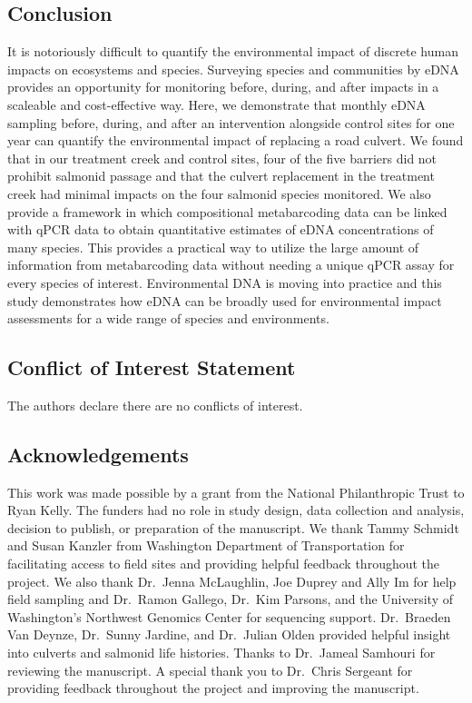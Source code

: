 \documentclass[
]{article}
\begin{document}
\hypertarget{conclusion}{%
\subsection{Conclusion}\label{conclusion}}

It is notoriously difficult to quantify the environmental impact of
discrete human impacts on ecosystems and species. Surveying species and
communities by eDNA provides an opportunity for monitoring before,
during, and after impacts in a scaleable and cost-effective way. Here,
we demonstrate that monthly eDNA sampling before, during, and after an
intervention alongside control sites for one year can quantify the
environmental impact of replacing a road culvert. We found that in our
treatment creek and control sites, four of the five barriers did not
prohibit salmonid passage and that the culvert replacement in the
treatment creek had minimal impacts on the four salmonid species
monitored. We also provide a framework in which compositional
metabarcoding data can be linked with qPCR data to obtain quantitative
estimates of eDNA concentrations of many species. This provides a
practical way to utilize the large amount of information from
metabarcoding data without needing a unique qPCR assay for every species
of interest. Environmental DNA is moving into practice and this study
demonstrates how eDNA can be broadly used for environmental impact
assessments for a wide range of species and environments.

\hypertarget{conflict-of-interest-statement}{%
\subsection{Conflict of Interest
Statement}\label{conflict-of-interest-statement}}

The authors declare there are no conflicts of interest.

\hypertarget{acknowledgements}{%
\subsection{Acknowledgements}\label{acknowledgements}}

This work was made possible by a grant from the National Philanthropic
Trust to Ryan Kelly. The funders had no role in study design, data
collection and analysis, decision to publish, or preparation of the
manuscript. We thank Tammy Schmidt and Susan Kanzler from Washington
Department of Transportation for facilitating access to field sites and
providing helpful feedback throughout the project. We also thank
Dr.~Jenna McLaughlin, Joe Duprey and Ally Im for help field sampling and
Dr.~Ramon Gallego, Dr.~Kim Parsons, and the University of Washington's
Northwest Genomics Center for sequencing support. Dr.~Braeden Van
Deynze, Dr.~Sunny Jardine, and Dr.~Julian Olden provided helpful insight
into culverts and salmonid life histories. Thanks to Dr.~Jameal Samhouri
for reviewing the manuscript. A special thank you to Dr.~Chris Sergeant
for providing feedback throughout the project and improving the
manuscript.
\end{document}
